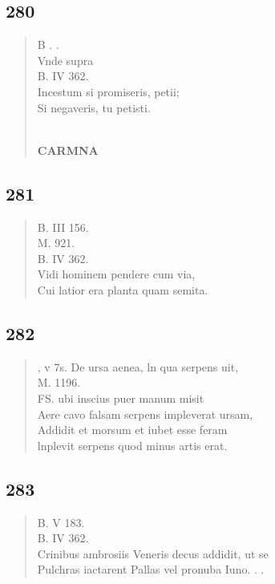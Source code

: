 \documentclass[11pt, a4paper]{report}
\begin{document}
            \subsection*{280}
      \begin{verse}
      B . . \\ Vnde supra \\ B. IV 362. \\ Incestum si promiseris, petii; \\ Si negaveris, tu petisti. \\ 
        ﻿\pagebreak 
    \begin{center} \textbf{CARMNA} \end{center} \marginpar{[220]} 
      \end{verse}
  
            \subsection*{281}
      \begin{verse}
      B. III 156. \\ M. 921. \\ B. IV 362. \\ Vidi hominem pendere cum via, \\ Cui latior era planta quam semita. \\ 
      \end{verse}
  
            \subsection*{282}
      \begin{verse}
      , v 7s. De ursa aenea, ln qua serpens uit, \\ M. 1196. \\ FS. ubi inscius puer manum misit \\ Aere cavo falsam serpens impleverat ursam, \\ Addidit et morsum et iubet esse feram \\ lnplevit serpens quod minus artis erat. \\ 
      \end{verse}
  
            \subsection*{283}
      \begin{verse}
      B. V 183. \\ B. IV 362. \\ Crinibus ambrosiis Veneris decus addidit, ut se \\ Pulchras iactarent Pallas vel pronuba Iuno. . . \\ 
      \end{verse}
  
\end{document}
